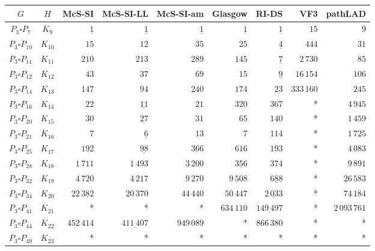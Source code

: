 
\begin{tabular}{ccrrrrrrr}
    \toprule
    {$G$} & {$H$} & {McS-SI} & {McS-SI-LL} & {McS-SI-am} & Glasgow & RI-DS & VF3 & pathLAD \\ 
    \midrule

$P_3\square P_{7}$ & $K_{9}$ & $\underline{1}$ & $\underline{1}$ & $\underline{1}$ & $\underline{1}$ & $\underline{1}$ & $15$ & $9$\\
$P_3\square P_{10}$ & $K_{10}$ & $15$ & $12$ & $35$ & $25$ & $\underline{4}$ & $444$ & $31$\\
$P_3\square P_{11}$ & $K_{11}$ & $210$ & $213$ & $289$ & $145$ & $\underline{7}$ & $2\,730$ & $85$\\
$P_3\square P_{12}$ & $K_{12}$ & $43$ & $37$ & $69$ & $15$ & $\underline{9}$ & $16\,154$ & $106$\\
$P_3\square P_{14}$ & $K_{13}$ & $147$ & $94$ & $240$ & $174$ & $\underline{23}$ & $333\,160$ & $245$\\
$P_3\square P_{16}$ & $K_{14}$ & $22$ & $\underline{11}$ & $21$ & $320$ & $367$ & * & $4\,945$\\
$P_3\square P_{20}$ & $K_{15}$ & $30$ & $\underline{27}$ & $31$ & $65$ & $140$ & * & $1\,459$\\
$P_3\square P_{21}$ & $K_{16}$ & $7$ & $\underline{6}$ & $13$ & $7$ & $114$ & * & $1\,725$\\
$P_3\square P_{25}$ & $K_{17}$ & $192$ & $\underline{98}$ & $366$ & $616$ & $193$ & * & $4\,083$\\
$P_3\square P_{28}$ & $K_{18}$ & $1\,711$ & $1\,493$ & $3\,200$ & $\underline{356}$ & $374$ & * & $9\,891$\\
$P_3\square P_{32}$ & $K_{19}$ & $4\,720$ & $4\,217$ & $9\,270$ & $9\,508$ & $\underline{688}$ & * & $26\,583$\\
$P_3\square P_{34}$ & $K_{20}$ & $22\,382$ & $20\,370$ & $44\,440$ & $50\,447$ & $\underline{2\,033}$ & * & $74\,184$\\
$P_3\square P_{41}$ & $K_{21}$ & * & * & * & $634\,110$ & $\underline{149\,497}$ & * & $2\,093\,761$\\
$P_3\square P_{44}$ & $K_{22}$ & $452\,414$ & $\underline{411\,407}$ & $949\,089$ & * & $866\,380$ & * & *\\
$P_3\square P_{49}$ & $K_{23}$ & * & * & * & * & * & * & *\\

    \bottomrule
\end{tabular}

